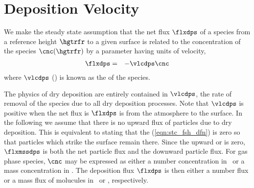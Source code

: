 \documentclass[12pt,twoside]{book}
\begin{document}
\section[Deposition Velocity]{Deposition Velocity}\label{sxn:vlc_dps}
We make the steady state assumption that the net flux $\flxdps$ of
a species from a reference height $\hgtrfr$ to a given surface is
related to the concentration of the species $\cnc(\hgtrfr)$ by a
parameter having units of velocity,
\begin{eqnarray}
\flxdps & = & - \vlcdps \cnc %
\label{eqn:flx_dps_dfn}
\end{eqnarray}
where $\vlcdps$ (\mxs) is known as the  of
the species. 

The physics of dry deposition are entirely contained in $\vlcdps$,
the rate of removal of the species due to all dry deposition
processes.  
Note that $\vlcdps$ is positive when the net flux is $\flxdps$
is from the atmosphere to the surface. 
In the following we assume that there is no upward flux of particles
due to dry deposition.
This is equivalent to stating that the 
(\ref{eqn:stc_fsh_dfn}) is zero so that particles which strike the
surface remain there.
Since the upward or  is zero, $\flxmssdps$
is both the net particle flux and the downward particle flux.
For gas phase species, $\cnc$ may be expressed as either a number
concentration in \nbrxmC\ or a mass concentration in \kgxmC.
The deposition flux $\flxdps$ is then either a number flux or a mass
flux of molucules in \nbrxmSs\ or \kgxmSs, respectively. 
\end{document}
